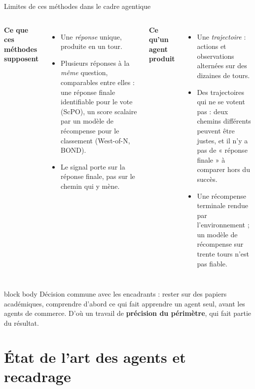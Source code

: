 \documentclass[aspectratio=169,10pt]{beamer}
\newcommand{\hl}[1]{\textcolor{crOrange}{\textbf{#1}}}
\newenvironment{keymsg}{\begin{beamercolorbox}[sep=6pt,wd=\textwidth]{block body}\small}{\end{beamercolorbox}}
\begin{document}
\begin{frame}{Limites de ces méthodes dans le cadre agentique}
\small
\begin{columns}[T]
\textbf{Ce que ces méthodes supposent}
\begin{itemize}
  \item Une \emph{réponse} unique, produite en un tour.
  \item Plusieurs réponses à la \emph{même} question, comparables entre elles : une réponse finale identifiable pour le vote (ScPO), un score scalaire par un modèle de récompense pour le classement (West-of-N, BOND).
  \item Le signal porte sur la réponse finale, pas sur le chemin qui y mène.
\end{itemize}
\textbf{Ce qu'un agent produit}
\begin{itemize}
  \item Une \emph{trajectoire} : actions et observations alternées sur des dizaines de tours.
  \item Des trajectoires qui ne se votent pas : deux chemins différents peuvent être justes, et il n'y a pas de « réponse finale » à comparer hors du succès.
  \item Une récompense terminale rendue par l'environnement ; un modèle de récompense sur trente tours n'est pas fiable.
\end{itemize}
\end{columns}
\vspace{0.15cm}
\begin{keymsg}
Décision commune avec les encadrants : rester sur des papiers académiques, comprendre d'abord ce qui fait apprendre un agent seul, avant les agents de commerce. D'où un travail de \hl{précision du périmètre}, qui fait partie du résultat.
\end{keymsg}
\end{frame}

\section{État de l'art des agents et recadrage}
\end{document}
